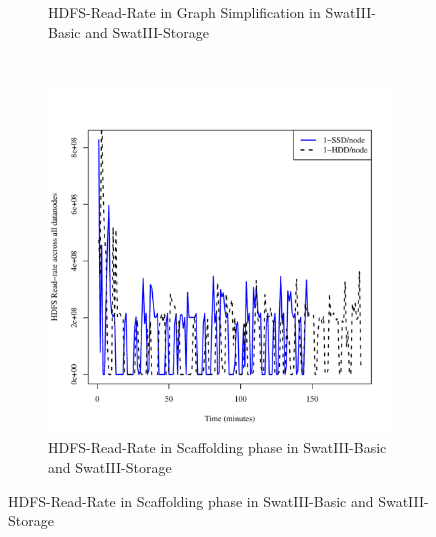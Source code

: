\documentclass[conference]{IEEEtran}
\begin{document}
\begin{figure}[t]
\begin{subfigure}[b]{0.2\textwidth}
                \caption{HDFS-Read-Rate in Graph Simplification in SwatIII-Basic and SwatIII-Storage}
                \label{fig:ECHddSsdHdfsRdIops}
        \end{subfigure}
        ~ %
        \begin{subfigure}[b]{0.2\textwidth}
                \includegraphics[width=\textwidth]{Figure/SystemData/Plots/SCFHddSsdHdfsRdIops.pdf}
                \caption{HDFS-Read-Rate in Scaffolding phase in SwatIII-Basic and SwatIII-Storage}
                \label{fig:SCFHddSsdHdfsRdIops}
        \end{subfigure}
        

\end{figure}
\end{document}

